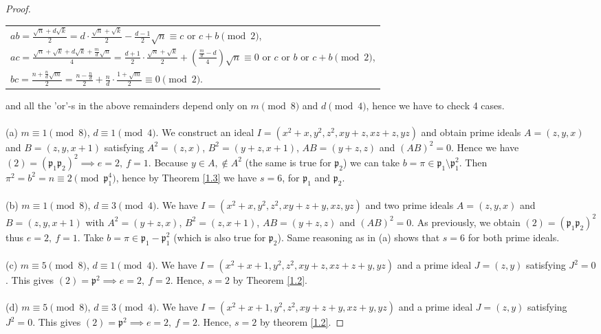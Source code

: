 \documentclass[12pt]{article}
\theoremstyle{remark}
\begin{document}
\begin{proof}
\begin{center}
\begin{tabular}{@{}l@{}}
$ab = \frac{\sqrt{n} + d\sqrt{k}}{2} = d \cdot \frac{\sqrt{n}+\sqrt{k}}{2} - \frac{d-1}{2} \sqrt{n} \equiv c \text{ or } c+b \pmod{2}$,\\
$ac = \frac{\sqrt{n} + \sqrt{k} + d\sqrt{k} + \frac{m}{d} \sqrt{n} }{4} =  \frac{d+1}{2} \cdot \frac{\sqrt{n}+\sqrt{k}}{2} + (\frac{\frac{m}{d}-d}{4})\sqrt{n} \equiv 0 \text{ or } c \text{ or } b \text{ or } c+b \pmod{2}$,\\
$bc = \frac{n + \frac{n}{d}\sqrt{m}}{2} = \frac{n - \frac{n}{d}}{2} + \frac{n}{d} \cdot \frac{1+ \sqrt{m}}{2} \equiv 0 \pmod{2} $.
\end{tabular}
\end{center}
and all the 'or'-s in the above remainders depend only on $m \pmod{8}$ and $d \pmod{4}$, hence we have to check 4 cases.
\\ \\
(a) $m \equiv 1 \pmod{8}$, $d \equiv 1 \pmod{4}$. We construct an ideal
$I = (x^2+x,y^2,z^2,xy+z,xz+z,yz)$ and obtain prime ideals $A = (z,y,x)$ and $B = (z,y,x+1)$ satisfying $A^2 = (z,x)$, $B^2=(y+z,x+1)$, $AB = (y+z,z)$ and $(AB)^2 = 0$. Hence we have $(2) = (\mathfrak{p}_1\mathfrak{p}_2)^2 \implies e=2, \ f=1$.  Because $y \in A, \not\in A^2$ (the same is true for $\mathfrak{p}_2$) we can take $b = \pi \in \mathfrak{p}_1 \setminus \mathfrak{p}_1^2$. Then  $\pi^2 = b^2 = n \equiv 2 \pmod{\mathfrak{p}_1^4}$, hence by Theorem \ref{1.3} we have $s=6$, for $\mathfrak{p}_1$ and $\mathfrak{p}_2$.
\\ \\
(b) $m \equiv 1 \pmod{8}$, $d \equiv 3 \pmod{4}$. We have $I = (x^2+x,y^2,z^2,xy+z+y,xz,yz)$ and two prime ideals $A = (z,y,x)$ and $B=(z,y,x+1)$ with $A^2 = (y+z,x)$, $B^2 = (z,x+1)$, $AB = (y+z,z)$ and $(AB)^2 = 0$. As previously, we obtain $(2) = (\mathfrak{p}_1\mathfrak{p}_2)^2$ thus $e=2, \ f=1$. Take $b = \pi \in \mathfrak{p}_1 - \mathfrak{p}_1^2$ (which is also true for $\mathfrak{p}_2$). Same reasoning as in (a) shows that $s=6$ for both prime ideals.
\\ \\
(c) $m \equiv 5 \pmod{8}$, $d \equiv 1 \pmod{4}$. We have $I = (x^2+x+1,y^2,z^2,xy+z,xz+z+y,yz)$ and a prime ideal $J = (z,y)$ satisfying $J^2=0$. This gives $(2) = \mathfrak{p}^2 \implies e=2,\ f=2.$ Hence, $ s=2$ by Theorem \ref{1.2}.
\\ \\
(d) $m \equiv 5 \pmod{8}$, $d \equiv 3 \pmod{4}$. We have $I = (x^2+x+1,y^2,z^2,xy+z+y,xz+y,yz)$ and a prime ideal $J = (z,y)$ satisfying $J^2=0$. This gives $(2) = \mathfrak{p}^2 \implies e=2,\ f=2$. Hence, $s=2$ by theorem \ref{1.2}.

\end{proof}
\end{document}
